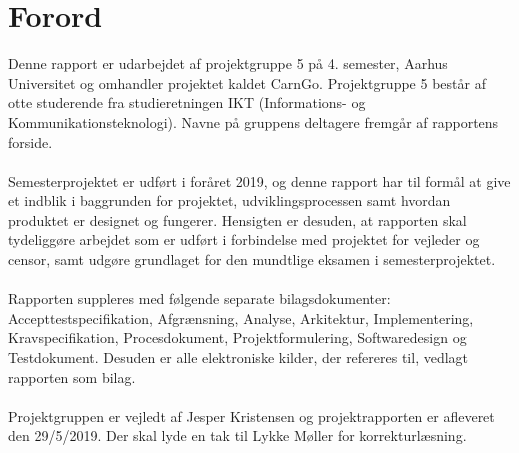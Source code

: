 \documentclass[Rapport/Rapport_main.tex]{subfiles}
\begin{document}
\section{Forord}
Denne rapport er udarbejdet af projektgruppe 5 på 4. semester, Aarhus Universitet og omhandler projektet kaldet CarnGo.
Projektgruppe 5 består af otte studerende fra studieretningen IKT (Informations- og Kommunikationsteknologi). Navne på gruppens deltagere fremgår af rapportens forside. \\\\Semesterprojektet er udført i foråret 2019, og denne rapport har til formål at give et indblik i baggrunden for projektet, udviklingsprocessen samt hvordan produktet er designet og fungerer. Hensigten er desuden, at rapporten skal tydeliggøre arbejdet som er udført i forbindelse med projektet for vejleder og censor, samt udgøre grundlaget for den mundtlige eksamen i semesterprojektet. \\\\Rapporten suppleres med følgende separate bilagsdokumenter: Accepttestspecifikation, Afgrænsning, Analyse, Arkitektur, Implementering, Kravspecifikation, Procesdokument, Projektformulering, Softwaredesign og Testdokument. Desuden er alle elektroniske kilder, der refereres til, vedlagt rapporten som bilag. \\\\Projektgruppen er vejledt af Jesper Kristensen og projektrapporten er afleveret den 29/5/2019. Der skal lyde en tak til Lykke Møller for korrekturlæsning. 
\end{document}
